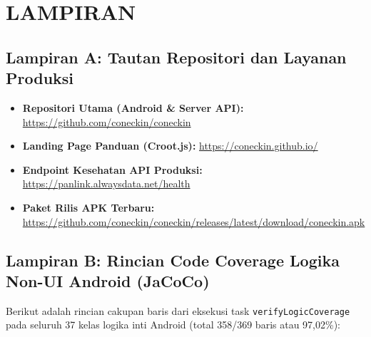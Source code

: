 \chapter*{LAMPIRAN}

\section*{Lampiran A: Tautan Repositori dan Layanan Produksi}
\begin{itemize}[leftmargin=*]
  \item \textbf{Repositori Utama (Android \& Server API):} \url{https://github.com/coneckin/coneckin}
  \item \textbf{Landing Page Panduan (Croot.js):} \url{https://coneckin.github.io/}
  \item \textbf{Endpoint Kesehatan API Produksi:} \url{https://panlink.alwaysdata.net/health}
  \item \textbf{Paket Rilis APK Terbaru:} \url{https://github.com/coneckin/coneckin/releases/latest/download/coneckin.apk}
\end{itemize}

\section*{Lampiran B: Rincian Code Coverage Logika Non-UI Android (JaCoCo)}
Berikut adalah rincian cakupan baris dari eksekusi task \texttt{verifyLogicCoverage} pada seluruh 37 kelas logika inti Android (total 358/369 baris atau 97,02\%):

